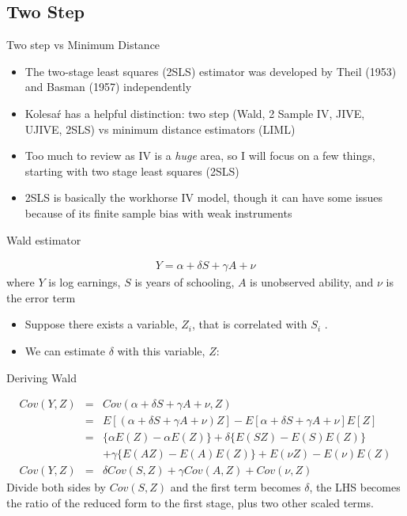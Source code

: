 \documentclass{beamer}
\begin{document}
\subsection{Two Step}

\begin{frame}{Two step vs Minimum Distance}

\begin{itemize}
\item The two-stage least squares (2SLS) estimator was developed by Theil (1953) and Basman (1957) independently
\item Kolesa\'r has a helpful distinction: two step (Wald, 2 Sample IV, JIVE, UJIVE, 2SLS) vs minimum distance estimators (LIML)
\item Too much to review as IV is a \emph{huge} area, so I will focus on a few things, starting with two stage least squares (2SLS)
\item 2SLS is basically the workhorse IV model, though it can have some issues because of its finite sample bias with weak instruments
\end{itemize}

\end{frame}




\begin{frame}{Wald estimator}

\begin{eqnarray*}
Y = \alpha + \delta S + \gamma A + \nu
\end{eqnarray*}
where $Y$ is log earnings, $S$ is years of schooling, $A$ is unobserved ability, and $\nu$ is the error term

\begin{itemize}
	\item Suppose there exists a variable, $Z_i$, that is correlated with $S_i$ .
	\item We can estimate $\delta$ with this variable, $Z$:
\end{itemize}

\end{frame}


\begin{frame}{Deriving Wald}
	
		\begin{eqnarray*}
		Cov(Y,Z) 	&=& Cov(\alpha + \delta{S} + \gamma{A} + \nu, Z) \\
				&=&	E[(\alpha + \delta{S} + \gamma{A} + \nu)  Z] - E[\alpha + \delta{S} + \gamma{A} + \nu]E[Z] \\
				&=& \{\alpha E(Z) - \alpha E(Z) \} + \delta \{ E(SZ) - E(S)E(Z)\} \\
				&& + \gamma \{E(AZ) - E(A)E(Z) \} + E(\nu Z) - E(\nu)E(Z) \\
		Cov(Y,Z)	&=& \delta Cov(S,Z) + \gamma Cov(A,Z) + Cov(\nu,Z)
		\end{eqnarray*}
		Divide both sides by $Cov(S,Z)$ and the first term becomes $\delta$, the LHS becomes the ratio of the reduced form to the first stage, plus two other scaled terms.
\end{frame}
\end{document}
